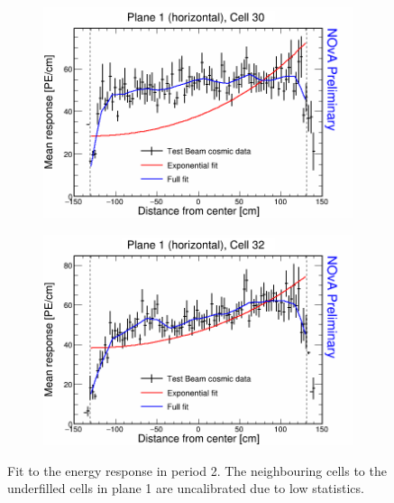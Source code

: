 \begin{figure}[h]
  \begin{subfigure}{0.495\textwidth}
    \includegraphics[width=\linewidth]{Plots/RelativeCalibrationResults/p2_001_030.png}
  \end{subfigure}
  \begin{subfigure}{0.495\textwidth}
    \includegraphics[width=\linewidth]{Plots/RelativeCalibrationResults/p2_001_032.png}
  \end{subfigure}
  \caption[Attenuation fits for underfilled cells in plane 1 in period 2 data]{Fit to the energy response in period 2. The neighbouring cells to the underfilled cells in plane 1 are uncalibrated due to low statistics.}
  \label{fig:AttenfitResultsPerio2_UnderfilledCellsPlane01}
\end{figure}

